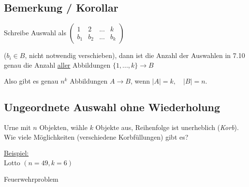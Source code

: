 \documentclass[a4paper, 12pt, twoside] {article}
\begin{document}
\subsection{Bemerkung / Korollar} %

Schreibe Auswahl als \quad
$
\begin{pmatrix}
1 & 2 & ... & k \\
b_1 & b_2 & ... & b_k
\end{pmatrix}
$

($b_i \in B$, nicht notwendig verschieben), dann ist die Anzahl der Auswahlen in 7.10 genau die Anzahl \uline{aller} Abbildungen $\{1, ... ,k\} \rightarrow B$

Also gibt es genau $n^k$ Abbildungen $A \rightarrow B$, wenn $|A| = k, \quad |B| = n$.

\subsection{Ungeordnete Auswahl ohne Wiederholung} %

Urne mit $n$ Objekten, wähle $k$ Objekte aus, Reihenfolge ist unerheblich (\textit{Korb}). Wie viele Möglichkeiten (verschiedene Korbfüllungen) gibt es?

\uline{Beispiel:} \\
Lotto $(n = 49, k = 6)$

Feuerwehrproblem
\end{document}
